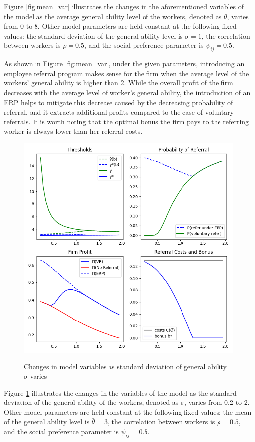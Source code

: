 \documentclass[12pt]{article}
\begin{document}
Figure \ref{fig:mean_var} illustrates the changes in the aforementioned variables of the model as the average general ability level of the workers, denoted as $\bar{\theta}$, varies from 0 to 8. Other model parameters are held constant at the following fixed values: the standard deviation of the general ability level is $\sigma = 1$, the correlation between workers is $\rho = 0.5$, and the social preference parameter is $\psi_{ij} = 0.5$.

As shown in Figure \ref{fig:mean_var}, under the given parameters, introducing an employee referral program makes sense for the firm when the average level of the workers' general ability is higher than 2. While the overall profit of the firm decreases with the average level of worker's general ability, the introduction of an ERP helps to mitigate this decrease caused by the decreasing probability of referral, and it extracts additional profits compared to the case of voluntary referrals. It is worth noting that the optimal bonus the firm pays to the referring worker is always lower than her referral costs.

\begin{figure}[ht]
    \caption{Changes in model variables as standard deviation of general ability $\sigma$ varies}
    \includegraphics[width=12cm]{images/imperf_st_dev_var.png}
    \centering
    \label{fig:st_dev_var}
\end{figure}

Figure \ref{fig:st_dev_var} illustrates the changes in the  variables of the model as the standard deviation of the general ability of the workers, denoted as $\sigma$, varies from 0.2 to 2. Other model parameters are held constant at the following fixed values: the mean of the general ability level is $\bar{\theta} = 3$, the correlation between workers is $\rho = 0.5$, and the social preference parameter is $\psi_{ij} = 0.5$.
\end{document}
